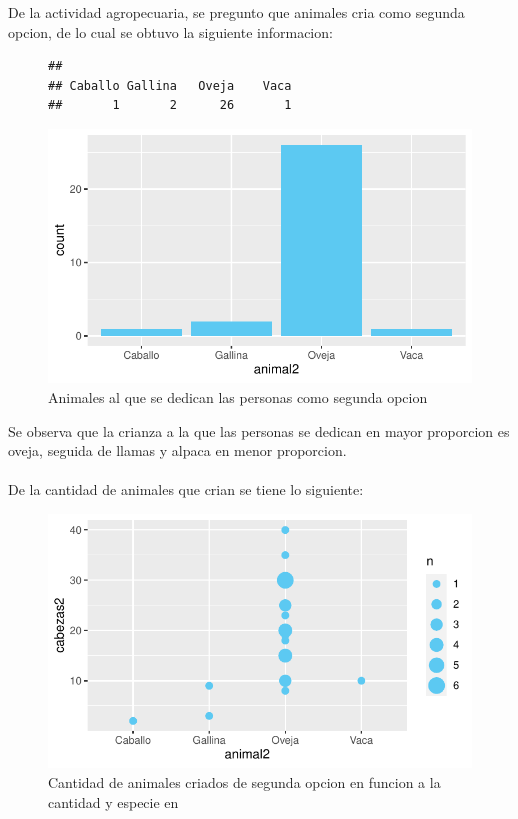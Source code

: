 \documentclass[12pt]{article}\usepackage[]{graphicx}\usepackage[]{xcolor}
\makeatletter
\def\maxwidth{ %
  \ifdim\Gin@nat@width>\linewidth
    \linewidth
  \else
    \Gin@nat@width
  \fi
}
\newenvironment{kframe}{%
 \def\at@end@of@kframe{}%
 \ifinner\ifhmode%
  \def\at@end@of@kframe{\end{minipage}}%
  \begin{minipage}{\columnwidth}%
 \fi\fi%
 \def\FrameCommand##1{\hskip\@totalleftmargin \hskip-\fboxsep
 \colorbox{shadecolor}{##1}\hskip-\fboxsep
     \hskip-\linewidth \hskip-\@totalleftmargin \hskip\columnwidth}%
 \MakeFramed {\advance\hsize-\width
   \@totalleftmargin\z@ \linewidth\hsize
   \@setminipage}}%
 {\par\unskip\endMakeFramed%
 \at@end@of@kframe}
\newenvironment{knitrout}{}{} %
\makeatother
\begin{document}
	
	De la actividad agropecuaria, se pregunto que animales cria como segunda opcion, de lo cual se obtuvo la siguiente informacion:
	\begin{figure}[H]
	\centering
\begin{knitrout}
\color{fgcolor}\begin{kframe}
\begin{verbatim}
## 
## Caballo Gallina   Oveja    Vaca 
##       1       2      26       1
\end{verbatim}
\end{kframe}
\includegraphics[width=\maxwidth]{figure/eighteen-1} 
\end{knitrout}
	\caption{Animales al que se dedican las personas como segunda opcion}
	\end{figure}
	Se observa que la crianza a la que las personas se dedican en mayor proporcion es oveja, seguida de llamas y alpaca en menor proporcion.\\
	\\
	De la cantidad de animales que crian se tiene lo siguiente:
	\begin{figure}[H]
	\centering
\begin{knitrout}
\color{fgcolor}
\includegraphics[width=\maxwidth]{figure/nineteen-1} 
\end{knitrout}
	\caption{Cantidad de animales criados de segunda opcion en funcion a la cantidad y especie en \comunidad}
	\end{figure}
	
\end{document}
